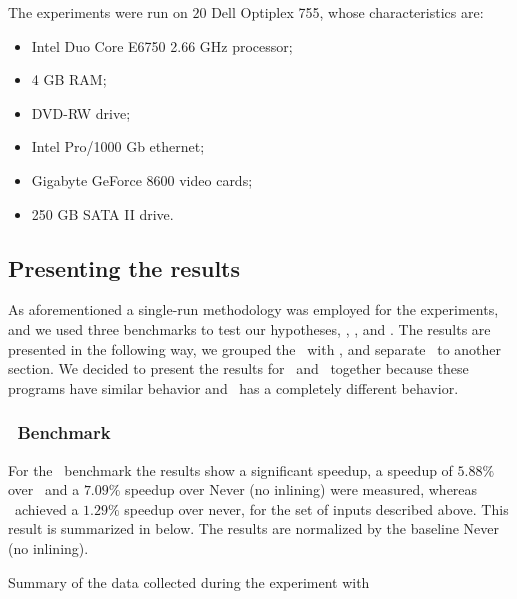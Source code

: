 
The experiments were run on $20$ Dell Optiplex 755, whose characteristics are:
\begin{itemize}

\item Intel Duo Core E6750 2.66 GHz processor;

\item 4 GB RAM;

\item DVD-RW drive;

\item Intel Pro/1000 Gb ethernet;

\item Gigabyte GeForce 8600 video cards;

\item 250 GB SATA II drive. 

\end{itemize}


\subsection{Presenting the results}

As aforementioned a single-run methodology was employed for the experiments, and we used three benchmarks to test our hypotheses, \bzip, \gzip, and \gcc. The results are presented in the following way, we grouped the \bzip\ with \gzip, and separate \gcc\ to another section. We decided to present the results for \bzip\ and \gzip\ together because these programs have similar behavior and \gcc\ has a completely different behavior.

\subsubsection{\Gcc\ Benchmark}

For the \gcc\ benchmark the results show a significant speedup, a speedup of $5.88 \%$ over \llvm\, and a $7.09 \%$ speedup over Never (no inlining) were measured, whereas \llvm\ achieved a $1.29 \%$ speedup over never, for the set of inputs described above. This result is summarized in  below. The results are normalized by the baseline Never (no inlining).

\begin{table}
  \centering
  \begin{tiny}
  
  \end{tiny}
  \caption{Summary of the data collected during the experiment with \gcc}
  \label{tab:speedupgcc}
\end{table}

